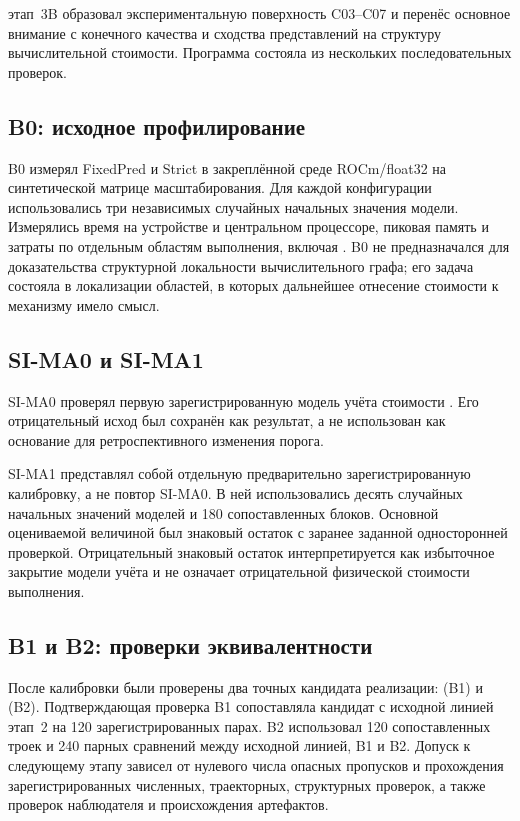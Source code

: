этап~3B образовал экспериментальную поверхность C03--C07 и перенёс основное
внимание с конечного качества и сходства представлений на структуру
вычислительной стоимости. Программа состояла из
нескольких последовательных проверок.

\subsection{B0: исходное профилирование}

B0 измерял FixedPred и Strict в закреплённой среде ROCm/float32 на
синтетической матрице масштабирования. Для каждой конфигурации использовались
три независимых случайных начальных значения модели. Измерялись время на
устройстве и центральном процессоре, пиковая память и затраты по отдельным
областям выполнения, включая . B0 не предназначался для
доказательства структурной локальности вычислительного графа; его задача
состояла в локализации областей, в которых дальнейшее отнесение стоимости к
механизму имело смысл.

\subsection{SI-MA0 и SI-MA1}

SI-MA0 проверял первую зарегистрированную модель учёта стоимости
. Его отрицательный исход был сохранён как результат, а
не использован как основание для ретроспективного изменения порога.

SI-MA1 представлял собой отдельную предварительно зарегистрированную
калибровку, а не повтор SI-MA0. В ней использовались десять случайных начальных
значений моделей и 180 сопоставленных блоков. Основной оцениваемой величиной
был знаковый остаток с заранее заданной односторонней проверкой. Отрицательный
знаковый остаток интерпретируется как избыточное закрытие модели учёта и не
означает отрицательной физической стоимости выполнения.

\subsection{B1 и B2: проверки эквивалентности}

После калибровки были проверены два точных кандидата реализации:
 (B1) и  (B2). Подтверждающая
проверка B1 сопоставляла кандидат с исходной линией этап~2 на 120
зарегистрированных парах. B2 использовал 120 сопоставленных троек и 240 парных
сравнений между исходной линией, B1 и B2. Допуск к следующему этапу зависел от
нулевого числа опасных пропусков и прохождения зарегистрированных численных,
траекторных, структурных проверок, а также проверок наблюдателя и происхождения
артефактов.

